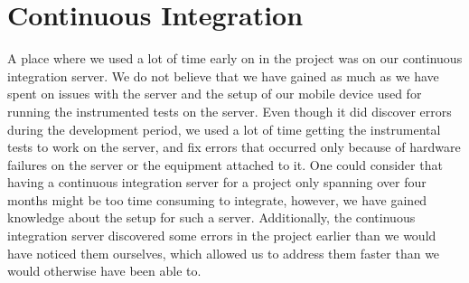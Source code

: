 
\section{Continuous Integration}
A place where we used a lot of time early on in the project was on our continuous integration server. We do not believe that we have gained as much as we have spent on issues with the server and the setup of our mobile device used for running the instrumented tests on the server.  Even though it did discover errors during the development period, we used a lot of time getting the instrumental tests to work on the server, and fix errors that occurred only because of hardware failures on the server or the equipment attached to it. One could consider that having a continuous integration server for a project only spanning over four months might be too time consuming to integrate, however, we have gained knowledge about the setup for such a server. Additionally, the continuous integration server discovered some errors in the project earlier than we would have noticed them ourselves, which allowed us to address them faster than we would otherwise have been able to. 